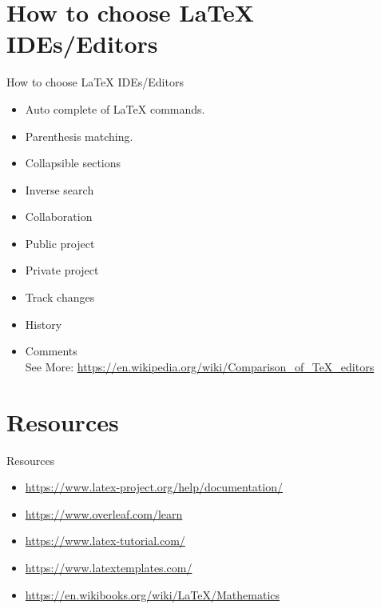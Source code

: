 \documentclass[dvipsnames, aspectratio=169]{beamer}
\begin{document}
	\section{How to choose {\LaTeX} IDEs/Editors}
	\begin{frame}[t]{How to choose {\LaTeX} IDEs/Editors}\vspace{10pt}
	\begin{itemize}
		\item Auto complete of {\LaTeX} commands. 
		\item Parenthesis matching. 
		\item Collapsible sections
		\item Inverse search
		\item Collaboration 
		\item Public project 
		\item Private project 
		\item Track changes 
		\item History 
		\item Comments \\ 
		See More: \url{https://en.wikipedia.org/wiki/Comparison_of_TeX_editors}
	\end{itemize}
	\end{frame}
	
	\section{Resources} 
	\begin{frame}[t]{Resources}\vspace{10pt}
	\begin{itemize}
		\item \url{https://www.latex-project.org/help/documentation/}
		\item \url{https://www.overleaf.com/learn}
		\item \url{https://www.latex-tutorial.com/}
		\item \url{https://www.latextemplates.com/} 
		\item \url{https://en.wikibooks.org/wiki/LaTeX/Mathematics}
	\end{itemize}
	\end{frame}
\end{document}
